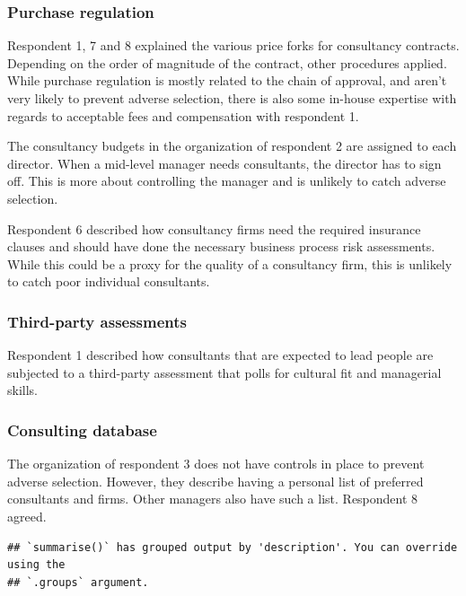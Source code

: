 \documentclass[12pt]{article}
\begin{document}
\subsubsection{Purchase regulation}\label{purchase-regulation}

Respondent 1, 7 and 8 explained the various price forks for consultancy
contracts. Depending on the order of magnitude of the contract, other
procedures applied. While purchase regulation is mostly related to the
chain of approval, and aren't very likely to prevent adverse selection,
there is also some in-house expertise with regards to acceptable fees
and compensation with respondent 1.

The consultancy budgets in the organization of respondent 2 are assigned
to each director. When a mid-level manager needs consultants, the
director has to sign off. This is more about controlling the manager and
is unlikely to catch adverse selection.

Respondent 6 described how consultancy firms need the required insurance
clauses and should have done the necessary business process risk
assessments. While this could be a proxy for the quality of a
consultancy firm, this is unlikely to catch poor individual consultants.

\subsubsection{Third-party assessments}\label{third-party-assessments-1}

Respondent 1 described how consultants that are expected to lead people
are subjected to a third-party assessment that polls for cultural fit
and managerial skills.

\subsubsection{Consulting database}\label{consulting-database-1}

The organization of respondent 3 does not have controls in place to
prevent adverse selection. However, they describe having a personal list
of preferred consultants and firms. Other managers also have such a
list. Respondent 8 agreed.

\begin{verbatim}
## `summarise()` has grouped output by 'description'. You can override using the
## `.groups` argument.
\end{verbatim}
\end{document}

